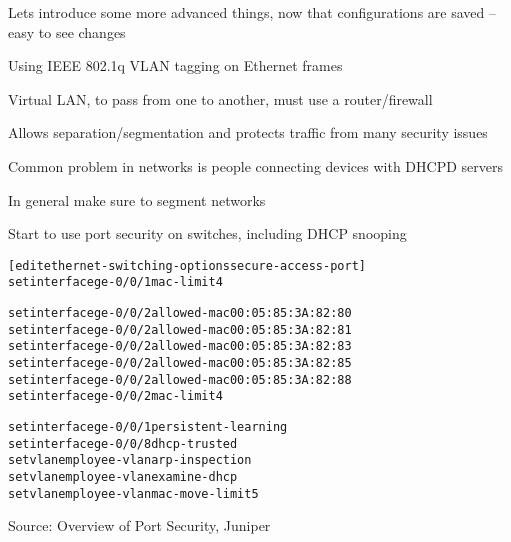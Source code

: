 \documentclass[Screen16to9,17pt]{foils}
\begin{document}


\begin{list1}
\item Lets introduce some more advanced things, now that configurations are saved -- easy to see changes
\item Using IEEE 802.1q  VLAN tagging on Ethernet frames
\item Virtual LAN, to pass from one to another, must use a router/firewall
\item Allows separation/segmentation and protects traffic from many security issues
\end{list1}



\begin{list1}
\item Common problem in networks is people connecting devices with DHCPD servers
\item In general make sure to segment networks
\item Start to use port security on switches, including DHCP snooping\\
\end{list1}


\begin{alltt}\small
[edit ethernet-switching-options secure-access-port]
set interface ge-0/0/1 mac-limit 4

set interface ge-0/0/2 allowed-mac 00:05:85:3A:82:80
set interface ge-0/0/2 allowed-mac 00:05:85:3A:82:81
set interface ge-0/0/2 allowed-mac 00:05:85:3A:82:83
set interface ge-0/0/2 allowed-mac 00:05:85:3A:82:85
set interface ge-0/0/2 allowed-mac 00:05:85:3A:82:88
set interface ge-0/0/2 mac-limit 4

set interface ge-0/0/1 persistent-learning
set interface ge-0/0/8 dhcp-trusted
set vlan employee-vlan arp-inspection
set vlan employee-vlan examine-dhcp
set vlan employee-vlan mac-move-limit 5
\end{alltt}

Source: Overview of Port Security, Juniper\\ {\small{}}




\end{document}
